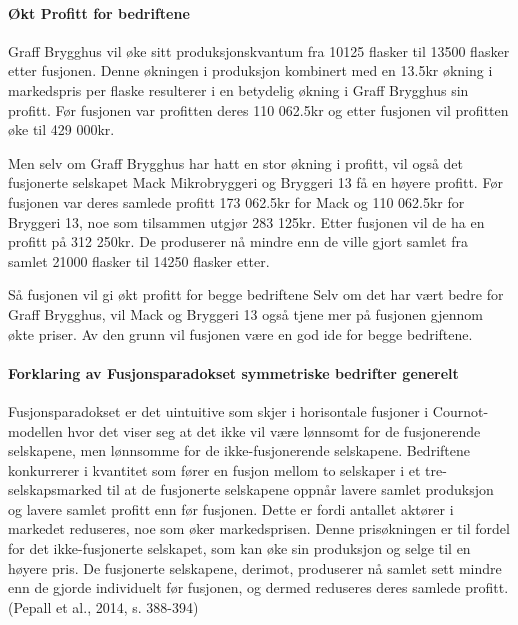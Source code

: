 \documentclass[
  12pt,
  a4paper,
  DIV=11,
  numbers=noendperiod]{scrartcl}
\let\oldparagraph\paragraph
\renewcommand{\paragraph}[1]{\oldparagraph{#1}\mbox{}}
\begin{document}
\paragraph{Økt Profitt for
bedriftene}\label{uxf8kt-profitt-for-bedriftene}

Graff Brygghus vil øke sitt produksjonskvantum fra 10125 flasker til
13500 flasker etter fusjonen. Denne økningen i produksjon kombinert med
en 13.5kr økning i markedspris per flaske resulterer i en betydelig
økning i Graff Brygghus sin profitt. Før fusjonen var profitten deres
110 062.5kr og etter fusjonen vil profitten øke til 429 000kr.

Men selv om Graff Brygghus har hatt en stor økning i profitt, vil også
det fusjonerte selskapet Mack Mikrobryggeri og Bryggeri 13 få en høyere
profitt. Før fusjonen var deres samlede profitt 173 062.5kr for Mack og
110 062.5kr for Bryggeri 13, noe som tilsammen utgjør 283 125kr. Etter
fusjonen vil de ha en profitt på 312 250kr. De produserer nå mindre enn
de ville gjort samlet fra samlet 21000 flasker til 14250 flasker etter.

Så fusjonen vil gi økt profitt for begge bedriftene Selv om det har vært
bedre for Graff Brygghus, vil Mack og Bryggeri 13 også tjene mer på
fusjonen gjennom økte priser. Av den grunn vil fusjonen være en god ide
for begge bedriftene.

\clearpage

\paragraph{Forklaring av Fusjonsparadokset symmetriske bedrifter
generelt}\label{forklaring-av-fusjonsparadokset-symmetriske-bedrifter-generelt}

Fusjonsparadokset er det uintuitive som skjer i horisontale fusjoner i
Cournot-modellen hvor det viser seg at det ikke vil være lønnsomt for de
fusjonerende selskapene, men lønnsomme for de ikke-fusjonerende
selskapene. Bedriftene konkurrerer i kvantitet som fører en fusjon
mellom to selskaper i et tre-selskapsmarked til at de fusjonerte
selskapene oppnår lavere samlet produksjon og lavere samlet profitt enn
før fusjonen. Dette er fordi antallet aktører i markedet reduseres, noe
som øker markedsprisen. Denne prisøkningen er til fordel for det
ikke-fusjonerte selskapet, som kan øke sin produksjon og selge til en
høyere pris. De fusjonerte selskapene, derimot, produserer nå samlet
sett mindre enn de gjorde individuelt før fusjonen, og dermed reduseres
deres samlede profitt.(Pepall et al., 2014, s. 388-394)
\end{document}

